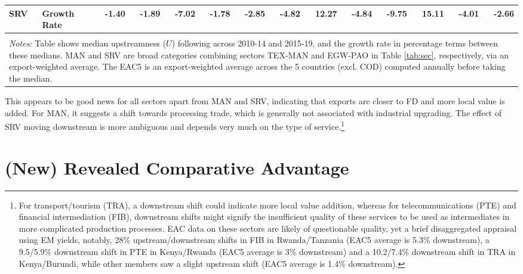 \documentclass[a4paper]{article}
\begin{document}
\begin{table}[h!]
{\begin{tabular}{llrrrrrrrrrrrr}
  SRV & Growth Rate & -1.40 & -1.89 & -7.02 & -1.78 & -2.85 & -4.82 & 12.27 & -4.84 & -9.75 & 15.11 & -4.01 & -2.66 \\ 
   \bottomrule \\ [-0.9em]
\multicolumn{14}{l}{\parbox{1.24\textwidth}{\scriptsize
\textit{Notes:} Table shows median upstreamness ($U$) following \citet{antras2012measuring} across 2010-14 and 2015-19, and the growth rate in percentage terms between these medians. MAN and SRV are broad categories combining sectors TEX-MAN and EGW-PAO in Table \ref{tab:sec}, respectively, via an export-weighted average. The EAC5 is an export-weighted average across the 5 countries (excl. COD) computed annually before taking the median.  }}
\end{tabular}
}
\end{table}
\FloatBarrier

This appears to be good news for all sectors apart from MAN and SRV, indicating that exports are closer to FD and more local value is added. For MAN, it suggests a shift towards processing trade, which is generally not associated with industrial upgrading. The effect of SRV moving downstream is more ambiguous and depends very much on the type of service.\footnote{For transport/tourism (TRA), a downstream shift could indicate more local value addition, whereas for telecommunications (PTE) and financial intermediation (FIB), downstream shifts might signify the insufficient quality of these services to be used as intermediates in more complicated production processes. EAC data on these sectors are likely of questionable quality, yet a brief disaggregated appraisal using EM yields, notably, 28\% upstream/downstream shifts in FIB in Rwanda/Tanzania (EAC5 average is 5.3\% downstream), a 9.5/5.9\% downstream shift in PTE in Kenya/Rwanda (EAC5 average is 3\% downstream) and a 10.2/7.4\% downstream shift in TRA in Kenya/Burundi, while other members saw a slight upstream shift (EAC5 average is 1.4\% downstream). }


\section{(New) Revealed Comparative Advantage}
\end{document}

